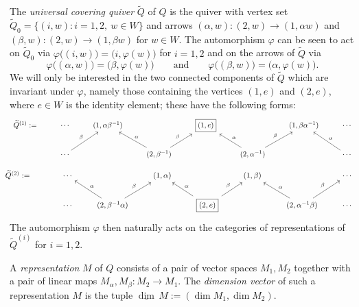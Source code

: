 \documentclass{amsart}
\numberwithin{equation}{section}
\newcommand{\udim}{\underline{\dim}\,}
\begin{document}
  The \emph{universal covering quiver} $\widetilde Q$ of $Q$ is the quiver with vertex set $\widetilde Q_0=\{(i,w):i=1,2,\ w\in W\}$ and arrows $(\alpha,w):(2,w)\to(1,\alpha w)$ and $(\beta,w):(2,w)\to(1,\beta w)$ for $w\in W$.
  The automorphism $\varphi$ can be seen to act on $\widetilde Q_0$ via $\varphi\big((i,w)\big)=\big(i,\varphi(w)\big)$ for $i=1,2$ and on the arrows of $\widetilde Q$ via
  \[\varphi\big((\alpha,w)\big)=\big(\beta,\varphi(w)\big) \qquad \text{and} \qquad \varphi\big((\beta,w)\big)=\big(\alpha,\varphi(w)\big).\]
  We will only be interested in the two connected components of $\widetilde Q$ which are invariant under $\varphi$, namely those containing the vertices $(1,e)$ and $(2,e)$, where $e\in W$ is the identity element; these have the following forms:
  \[
    \begin{tikzcd}
      \widetilde Q^{(1)} := & \cdots & (1,\alpha\beta^{-1}) & & \fbox{$(1,e)$} & & (1,\beta\alpha^{-1}) & \cdots \\
      & \cdots \arrow["\beta"]{ur} & & (2,\beta^{-1}) \arrow["\alpha"']{ul} \arrow["\beta"]{ur} & & (2,\alpha^{-1}) \arrow["\alpha"']{ul} \arrow["\beta"]{ur} & & \cdots \arrow["\alpha"']{ul}
    \end{tikzcd}
  \]
  \[
    \begin{tikzcd}
      \hspace{-0.37cm} \widetilde Q^{(2)} := \hspace{0.37cm} & \cdots & & (1,\alpha) & & (1,\beta) & & \cdots \\
      & \cdots & (2,\beta^{-1}\alpha) \arrow["\alpha"']{ul} \arrow["\beta"]{ur} & & \fbox{$(2,e)$} \arrow["\alpha"']{ul} \arrow["\beta"]{ur} & & (2,\alpha^{-1}\beta) \arrow["\alpha"']{ul} \arrow["\beta"]{ur} & \cdots
    \end{tikzcd}
  \]
  The automorphism $\varphi$ then naturally acts on the categories of representations of $\widetilde Q^{(i)}$ for $i=1,2$.

  A \emph{representation} $M$ of $Q$ consists of a pair of vector spaces $M_1,M_2$ together with a pair of linear maps $M_\alpha,M_\beta:M_2\to M_1$.
  The \emph{dimension vector} of such a representation $M$ is the tuple $\udim M:=(\dim M_1,\dim M_2)$.
\end{document}
